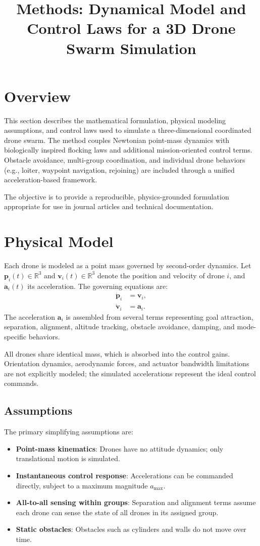 \documentclass[12pt]{article}
\title{Methods: Dynamical Model and Control Laws for a 3D Drone Swarm Simulation}
\author{}
\date{}
\begin{document}
\maketitle

\section{Overview}
This section describes the mathematical formulation, physical modeling assumptions, and control laws used to simulate a three-dimensional coordinated drone swarm. The method couples Newtonian point-mass dynamics with biologically inspired flocking laws and additional mission-oriented control terms. Obstacle avoidance, multi-group coordination, and individual drone behaviors (e.g., loiter, waypoint navigation, rejoining) are included through a unified acceleration-based framework.

The objective is to provide a reproducible, physics-grounded formulation appropriate for use in journal articles and technical documentation.

\section{Physical Model}
Each drone is modeled as a point mass governed by second-order dynamics. Let $\mathbf{p}_i(t) \in \mathbb{R}^3$ and $\mathbf{v}_i(t) \in \mathbb{R}^3$ denote the position and velocity of drone $i$, and $\mathbf{a}_i(t)$ its acceleration. The governing equations are:
\begin{align}
\dot{\mathbf{p}}_i &= \mathbf{v}_i,\\
\dot{\mathbf{v}}_i &= \mathbf{a}_i.
\end{align}
The acceleration $\mathbf{a}_i$ is assembled from several terms representing goal attraction, separation, alignment, altitude tracking, obstacle avoidance, damping, and mode-specific behaviors.

All drones share identical mass, which is absorbed into the control gains. Orientation dynamics, aerodynamic forces, and actuator bandwidth limitations are not explicitly modeled; the simulated accelerations represent the ideal control commands.

\subsection{Assumptions}
The primary simplifying assumptions are:
\begin{itemize}
\item \textbf{Point-mass kinematics}: Drones have no attitude dynamics; only translational motion is simulated.
\item \textbf{Instantaneous control response}: Accelerations can be commanded directly, subject to a maximum magnitude $a_{\max}$.
\item \textbf{All-to-all sensing within groups}: Separation and alignment terms assume each drone can sense the state of all drones in its assigned group.
\item \textbf{Static obstacles}: Obstacles such as cylinders and walls do not move over time.
\end{itemize}
\end{document}
